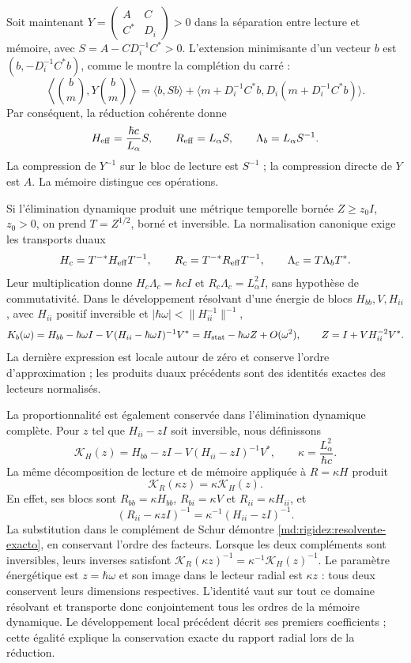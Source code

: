 Soit maintenant
$Y=\left(\begin{smallmatrix}A&C\\C^*&D_i\end{smallmatrix}\right)>0$
dans la séparation entre lecture et mémoire, avec
$S=A-CD_i^{-1}C^*>0$. L’extension minimisante d’un vecteur $b$ est
$(b,-D_i^{-1}C^*b)$, comme le montre la complétion du carré :
\[
 \left\langle\binom b m,Y\binom b m\right\rangle
 =\langle b,Sb\rangle+
 \langle m+D_i^{-1}C^*b,D_i(m+D_i^{-1}C^*b)\rangle.
\]
Par conséquent, la réduction cohérente donne
\[
 H_{\rm eff}=\frac{\hbar c}{L_\alpha}S,\qquad
 R_{\rm eff}=L_\alpha S,\qquad\Lambda_b=L_\alpha S^{-1}.
\]
La compression de $Y^{-1}$ sur le bloc de lecture est $S^{-1}$ ;
la compression directe de $Y$ est $A$. La mémoire distingue ces opérations.

Si l’élimination dynamique produit une métrique temporelle bornée
$Z\ge z_0I$, $z_0>0$, on prend $T=Z^{1/2}$, borné et inversible.
La normalisation canonique exige les transports duaux
\[
 H_c=T^{-*}H_{\rm eff}T^{-1},\qquad
 R_c=T^{-*}R_{\rm eff}T^{-1},\qquad
 \Lambda_c=T\Lambda_bT^*.
\]
Leur multiplication donne $H_c\Lambda_c=\hbar cI$ et
$R_c\Lambda_c=L_\alpha^2I$, sans hypothèse de commutativité.
Dans le développement résolvant d’une énergie de blocs $H_{bb},V,H_{ii}$,
avec $H_{ii}$ positif inversible et
$|\hbar\omega|<\|H_{ii}^{-1}\|^{-1}$,
\[
 K_b(\omega)=H_{bb}-\hbar\omega I
 -V(H_{ii}-\hbar\omega I)^{-1}V^*
 =H_{\rm stat}-\hbar\omega Z+O(\omega^2),
 \qquad Z=I+VH_{ii}^{-2}V^*.
\]
La dernière expression est locale autour de zéro et conserve l’ordre
d’approximation ; les produits duaux précédents sont des identités exactes
des lecteurs normalisés.

La proportionnalité est également conservée dans l’élimination dynamique
complète. Pour $z$ tel que $H_{ii}-zI$ soit inversible, nous définissons
\[
 \mathcal K_H(z)=H_{bb}-zI-V(H_{ii}-zI)^{-1}V^*,\qquad
 \kappa=\frac{L_\alpha^2}{\hbar c}.
\]
La même décomposition de lecture et de mémoire appliquée à $R=\kappa H$
produit
\begin{equation}
 \mathcal K_R(\kappa z)=\kappa\mathcal K_H(z).
 \label{md:rigidez:resolvente-exacto}
\end{equation}
En effet, ses blocs sont $R_{bb}=\kappa H_{bb}$,
$R_{bi}=\kappa V$ et $R_{ii}=\kappa H_{ii}$, et
\[
 (R_{ii}-\kappa zI)^{-1}
 =\kappa^{-1}(H_{ii}-zI)^{-1}.
\]
La substitution dans le complément de Schur démontre \eqref{md:rigidez:resolvente-exacto}, en conservant l'ordre des facteurs. Lorsque les deux compléments sont inversibles, leurs inverses satisfont $\mathcal K_R(\kappa z)^{-1}=\kappa^{-1}\mathcal K_H(z)^{-1}$. Le paramètre énergétique est $z=\hbar\omega$ et son image dans le lecteur radial est $\kappa z$ : tous deux conservent leurs dimensions respectives. L'identité vaut sur tout ce domaine résolvant et transporte donc conjointement tous les ordres de la mémoire dynamique. Le développement local précédent décrit ses premiers coefficients ; cette égalité explique la conservation exacte du rapport radial lors de la réduction.

